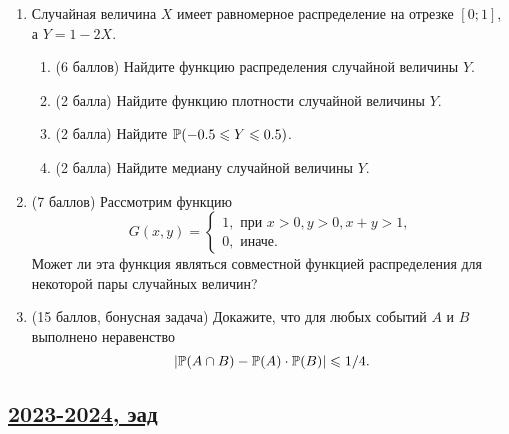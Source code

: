 \begin{enumerate}
\item Случайная величина $X$ имеет равномерное распределение на отрезке $[0; 1]$, а $Y = 1 - 2X$. 
 \begin{enumerate}
\item (6 баллов) Найдите функцию распределения случайной величины $Y$.
\item (2 балла) Найдите функцию плотности случайной величины $Y$.
\item (2 балла) Найдите $\P(- 0.5 \le Y \le 0.5 )$.
\item (2 балла) Найдите медиану случайной величины $Y$.
\end{enumerate}

\item (7 баллов) Рассмотрим функцию
\[
G(x,y) = 
\begin{cases}
1, \text{ при } x > 0, y > 0, x + y > 1, \\
0, \text{ иначе.}
\end{cases}
\]
Может ли эта функция являться совместной функцией распределения для некоторой пары случайных величин? 

\item (15 баллов, бонусная задача) Докажите, что для любых событий $A$ и $B$ выполнено неравенство 
\[
  \abs{ \P(A \cap B) - \P(A)\cdot \P(B)}  \le 1/4.
\]

\end{enumerate}


\subsection[2023-2024, эад]{\hyperref[sec:sol_kr_01_ead_2023_2024]{2023-2024, эад}}
\label{sec:kr_01_ead_2023_2024}

